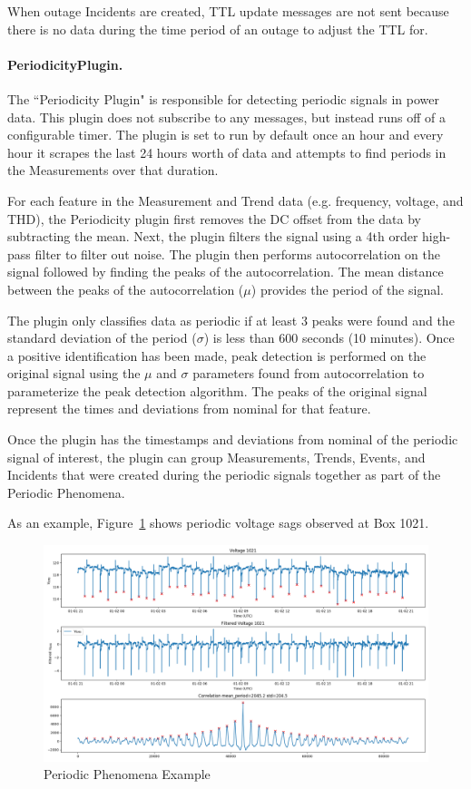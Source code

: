 When outage Incidents are created, TTL update messages are not sent because there is no data during the time period of an outage to adjust the TTL for.

\paragraph{PeriodicityPlugin.}

The ``Periodicity Plugin" is responsible for detecting periodic signals in power data. This plugin does not subscribe to any messages, but instead runs off of a configurable timer. The plugin is set to run by default once an hour and every hour it scrapes the last 24 hours worth of data and attempts to find periods in the Measurements over that duration.

For each feature in the Measurement and Trend data (e.g. frequency, voltage, and THD), the Periodicity plugin first removes the DC offset from the data by subtracting the mean. Next, the plugin filters the signal using a 4th order high-pass filter to filter out noise. The plugin then performs autocorrelation on the signal followed by finding the peaks of the autocorrelation. The mean distance between the peaks of the autocorrelation ($\mu$) provides the period of the signal.

The plugin only classifies data as periodic if at least 3 peaks were found and the standard deviation of the period ($\sigma$) is less than 600 seconds (10 minutes). Once a positive identification has been made, peak detection is performed on the original signal using the $\mu$ and $\sigma$ parameters found from autocorrelation to parameterize the peak detection algorithm. The peaks of the original signal represent the times and deviations from nominal for that feature.

Once the plugin has the timestamps and deviations from nominal of the periodic signal of interest, the plugin can group Measurements, Trends, Events, and Incidents that were created during the periodic signals together as part of the Periodic Phenomena.

As an example, Figure~\ref{fig:periodic_example} shows periodic voltage sags observed at Box 1021.

\begin{figure}[h]
	\centering
	\includegraphics[width=\linewidth]{figures/periodic_example.png}
	\caption{Periodic Phenomena Example}
	\label{fig:periodic_example}
\end{figure}

